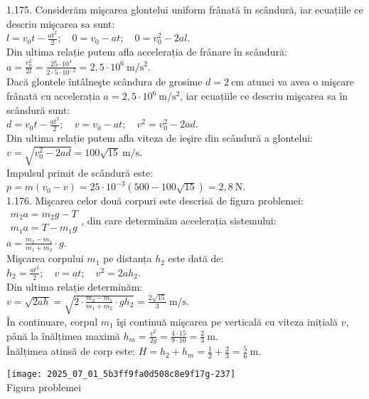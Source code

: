 1.175. Considerăm mişcarea glontelui uniform frânată în scândură, iar ecuațiile ce descriu mişcarea sa sunt:\\ $l=v_{0} t-\frac{a t^{2}}{2}; \quad 0=v_{0}-a t; \quad 0=v_{0}^{2}-2 a l$.\\ Din ultima relație putem afla accelerația de frânare în scândură:\\ $a=\frac{v_{0}^{2}}{2 l}=\frac{25 \cdot 10^{4}}{2 \cdot 5 \cdot 10^{-2}}=2,5 \cdot 10^{6} \mathrm{~m} / \mathrm{s}^{2}$.\\ Dacă glontele întâlneşte scândura de grosime $d=2 \mathrm{~cm}$ atunci va avea o mişcare frânată cu accelerația $a=2,5 \cdot 10^{6} \mathrm{~m} / \mathrm{s}^{2}$, iar ecuațiile ce descriu mişcarea sa în scândură sunt:\\ $d=v_{0} t-\frac{a t^{2}}{2}; \quad v=v_{0}-a t; \quad v^{2}=v_{0}^{2}-2 a d$.\\ Din ultima relație putem afla viteza de ieşire din scândură a glontelui:\\ $v=\sqrt{v_{0}^{2}-2 a d}=100 \sqrt{15} \mathrm{~m} / \mathrm{s}$.\\ Impulsul primit de scândură este:\\ $p=m\left(v_{0}-v\right)=25 \cdot 10^{-3}(500-100 \sqrt{15})=2,8 \mathrm{~N}$.\\

1.176. Mişcarea celor două corpuri este descrisă de figura problemei:\\ $\begin{array}{ll} m_{2} a=m_{2} g-T\\ m_{1} a=T-m_{1} g \end{array}$, din care determinăm accelerația sistemului:\\ $a=\frac{m_{2}-m_{1}}{m_{1}+m_{2}} \cdot g$.\\ Mişcarea corpului $m_{1}$ pe distanța $h_{2}$ este dată de:\\ $h_{2}=\frac{a t^{2}}{2}; \quad v=a t; \quad v^{2}=2 a h_{2}$.\\ Din ultima relație determinăm:\\ $v=\sqrt{2 a h}=\sqrt{2 \cdot \frac{m_{2}-m_{1}}{m_{1}+m_{2}} \cdot g h_{2}}=\frac{2 \sqrt{15}}{3} \mathrm{~m} / \mathrm{s}$.\\ În continuare, corpul $m_{1}$ îşi continuă mişcarea pe verticală cu viteza inițială $v$, până la înălțimea maximă $h_{m}=\frac{v^{2}}{2 g}=\frac{4 \cdot 15}{9 \cdot 10}=\frac{2}{3} \mathrm{~m}$.\\ Înălțimea atinsă de corp este: $H=h_{2}+h_{m}=\frac{1}{2}+\frac{2}{3}=\frac{5}{6} \mathrm{~m}$.\\ \begin{center} \texttt{[image: 2025\_07\_01\_5b3ff9fa0d508c8e9f17g-237]}\\ Figura problemei \end{center}

